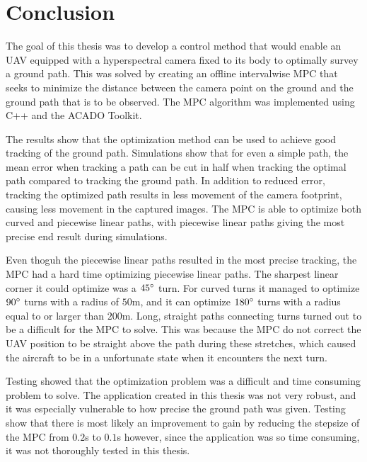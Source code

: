 \chapter{Conclusion}

The goal of this thesis was to develop a control method that would enable an UAV equipped with a hyperspectral camera fixed to its body to optimally survey a ground path. This was solved by creating an offline intervalwise MPC that seeks to minimize the distance between the camera point on the ground and the ground path that is to be observed. The MPC algorithm was implemented using C++ and the ACADO Toolkit.

The results show that the optimization method can be used to achieve good tracking of the ground path. Simulations show that for even a simple path, the mean error when tracking a path can be cut in half when tracking the optimal path compared to tracking the ground path. In addition to reduced error, tracking the optimized path results in less movement of the camera footprint, causing less movement in the captured images. The MPC is able to optimize both curved and piecewise linear paths, with piecewise linear paths giving the most precise end result during simulations.

Even thoguh the piecewise linear paths resulted in the most precise tracking, the MPC had a hard time optimizing piecewise linear paths. The sharpest linear corner it could optimize was a $45\degree$ turn. For curved turns it managed to optimize $90\degree$ turns with a radius of $50$m, and it can optimize $180\degree$ turns with a radius equal to or larger than $200$m. Long, straight paths connecting turns turned out to be a difficult for the MPC to solve. This was because the MPC do not correct the UAV position to be straight above the path during these stretches, which caused the aircraft to be in a unfortunate state when it encounters the next turn.

Testing showed that the optimization problem was a difficult and time consuming problem to solve. The application created in this thesis was not very robust, and it was especially vulnerable to how precise the ground path was given. Testing show that there is most likely an improvement to gain by reducing the stepsize of the MPC from $0.2$s to $0.1$s however, since the application was so time consuming, it was not thoroughly tested in this thesis.


